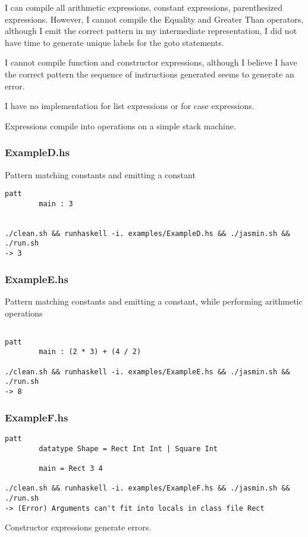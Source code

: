 \documentclass{article}
\begin{document}
I can compile all arithmetic expressions, constant expressions, parenthesized expressions. However, I cannot compile the Equality and Greater Than operators, although I emit the correct pattern in my intermediate representation, I did not have time to generate unique labels for the goto statements.

I cannot compile function and constructor expressions, although I believe I have the correct pattern the sequence of instructions generated seems to generate an error. 

I have no implementation for list expressions or for case expressions.

Expressions compile into operations on a simple stack machine.

\subsubsection{ExampleD.hs}

Pattern matching constants and emitting a constant

\begin{verbatim}
patt
        main : 3


./clean.sh && runhaskell -i. examples/ExampleD.hs && ./jasmin.sh && ./run.sh
-> 3

\end{verbatim}

\subsubsection{ExampleE.hs}

Pattern matching constants and emitting a constant, while performing arithmetic operations

\begin{verbatim}

patt
        main : (2 * 3) + (4 / 2)

./clean.sh && runhaskell -i. examples/ExampleE.hs && ./jasmin.sh && ./run.sh
-> 8
\end{verbatim}

\subsubsection{ExampleF.hs}

\begin{verbatim}
patt
        datatype Shape = Rect Int Int | Square Int
        
        main = Rect 3 4

./clean.sh && runhaskell -i. examples/ExampleF.hs && ./jasmin.sh && ./run.sh
-> (Error) Arguments can't fit into locals in class file Rect

\end{verbatim}

Constructor expressions generate errors.
\end{document}
